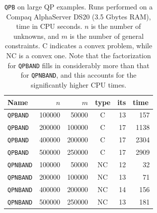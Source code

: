 \documentclass[acmtocl,acmnow]{acmtrans2m}
\begin{document}
\begin{table}[ht]
\begin{center}
\begin{tabular}[c]{|lrrc|rr|}
\hline
Name      & $n$ & $m$ & type & its & time\, \\
\hline
{\tt QPBAND}  & 100000 & 50000  & C &   13  & {157} \\
{\tt QPBAND}  & 200000 & 100000 & C &   17  & {1138} \\
{\tt QPBAND}  & 400000 & 200000 & C &   17  & {2304} \\
{\tt QPBAND}  & 500000 & 250000 & C &   17  & {2909} \\
\hline
{\tt QPNBAND}  & 100000 & 50000  & NC &   12  & {32} \\
{\tt QPNBAND}  & 200000 & 100000 & NC &   13  & {71} \\
{\tt QPNBAND}  & 400000 & 200000 & NC &   14  & {156} \\
{\tt QPNBAND}  & 500000 & 250000 & NC &   13  & {181} \\
\hline
\end{tabular}
\end{center}
\caption{\label{figa} {\tt QPB} on large QP examples.
Runs performed on a Compaq AlphaServer DS20 (3.5 Gbytes RAM),
time in CPU seconds. $n$ is the number of unknowns, and 
$m$ is the number of general constraints. 
C indicates a convex problem, while NC is a convex one.
Note that the factorization for {\tt QPBAND} fills in 
considerably more than that for {\tt QPNBAND}, and this
accounts for the significantly higher CPU times.}
\end{table}
\end{document}
